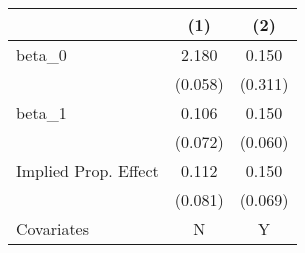 \begin{tabular}[t]{lcc}
\toprule
  & (1) & (2)\\
\midrule
beta\_0 & 2.180 & 0.150\\
 & (0.058) & (0.311)\\
beta\_1 & 0.106 & 0.150\\
 & (0.072) & (0.060)\\
Implied Prop. Effect & 0.112 & 0.150\\
 & (0.081) & (0.069)\\
\midrule
Covariates & N & Y\\
\bottomrule
\end{tabular}
